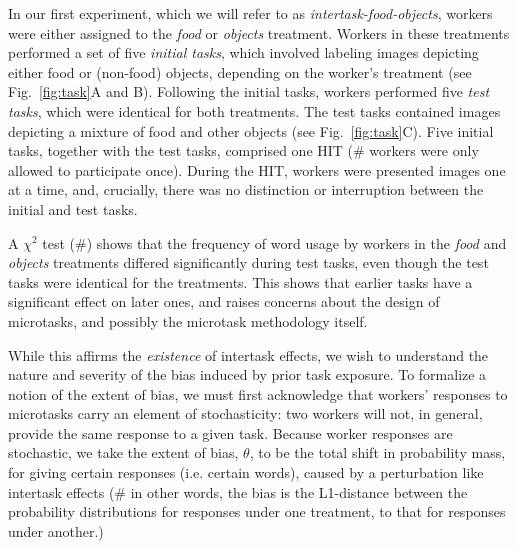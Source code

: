 \documentclass[12pt]{article}
\begin{document}
In our first experiment, which we will refer to as 
\textit{intertask-food-objects}, workers were either assigned to the 
\textit{food} or \textit{objects} treatment.  Workers in these treatments
performed a set of five \textit{initial tasks}, which involved labeling
images depicting either food or (non-food) objects, depending on the worker's 
treatment (see Fig.~\ref{fig:task}A and B).  Following the initial 
tasks, workers performed five \textit{test tasks}, which were identical for 
both treatments.  The test tasks contained images depicting a 
mixture of food and other objects (see Fig.~\ref{fig:task}C).  Five initial 
tasks, together with the test tasks, comprised one HIT 
(\# workers were only allowed to participate once). During the HIT, workers 
were presented images one at a time, and, crucially, there was no distinction
or interruption between the initial and test tasks.

A $\chi^2$ test (\#) shows that the frequency of word usage by
workers in the \textit{food} and \textit{objects} treatments differed
significantly during test tasks, even though the test tasks were identical 
for the treatments.  This shows that earlier tasks have a 
significant effect on later ones, and raises concerns about the 
design of microtasks, and possibly the microtask methodology itself.

While this affirms the \textit{existence} of intertask effects, we wish to
understand the nature and severity of the bias induced by prior task 
exposure.  To formalize a notion of the extent of bias, we must first 
acknowledge that workers' responses to microtasks
carry an element of stochasticity: two workers will not, in general, provide
the same response to a given task.  Because worker responses are stochastic,
we take the extent of bias, $\theta$, to be the total shift in probability 
mass, for giving certain responses (i.e. certain words),
caused by a perturbation like intertask effects (\# in other words, the 
bias is the L1-distance between the probability distributions for responses
under one treatment, to that for responses under another.)
\end{document}
